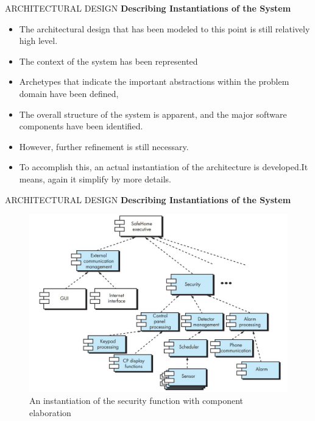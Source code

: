 \documentclass{beamer}
\begin{document}
\begin{frame}{ARCHITECTURAL DESIGN}
\textbf{Describing Instantiations of the System}
	\begin{itemize}
		\item The architectural design that has been modeled to this point is still relatively high level. 
		\item The context of the system has been represented 
		\item Archetypes that indicate the important abstractions within the problem domain have been defined, 
		\item The overall structure of the system is apparent, and the major software components have been identified. 
		\item However, further refinement is still necessary. 
		\item To accomplish this, an actual instantiation of the architecture is developed.It means, again it simplify by more details. 
	\end{itemize}
\end{frame}
\begin{frame}{ARCHITECTURAL DESIGN}
	\textbf{Describing Instantiations of the System}
		\begin{figure}
		\includegraphics[scale=.45]{img/m2_45.jpg}
		\caption{An instantiation of the security function with component elaboration}
	\end{figure}
\end{frame}
\end{document}
